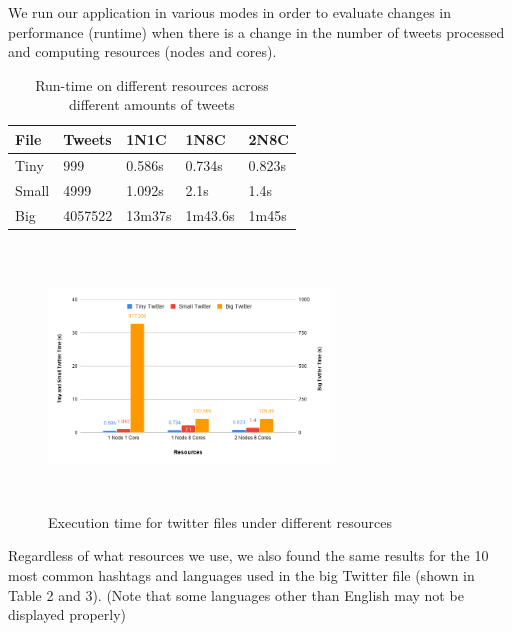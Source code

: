 \documentclass[11pt]{article}
\begin{document}
We run our application in various modes in order to evaluate changes in performance (runtime) when there is a change in the number of tweets processed and computing resources (nodes and cores).

\begin{table}[h]
 \begin{center}
\begin{tabular}{|l|l|l|l|l|}

      \hline
       File & Tweets &1N1C & 1N8C & 2N8C  \\
      \hline\hline
      Tiny & 999 & 0.586s & 0.734s & 0.823s \\
      Small & 4999 & 1.092s & 2.1s & 1.4s \\
      Big & 4057522 & 13m37s & 1m43.6s & 1m45s \\

     \hline

\end{tabular}
\caption{Run-time on different resources across different amounts of tweets}\label{table1}
 \end{center}
\end{table}

\begin{figure}[h]
\centering
\includegraphics[width=7.5cm, height=7cm]{twitter_hashtags/report/chart.png}
\caption[Caption for LOF]{Execution time for twitter files under different resources\protect\footnotemark}

\end{figure}

Regardless of what resources we use, we also found the same results for the 10 most common hashtags and languages used in the big Twitter file (shown in Table 2 and 3). (Note that some languages other than English may not be displayed properly)
\end{document}
